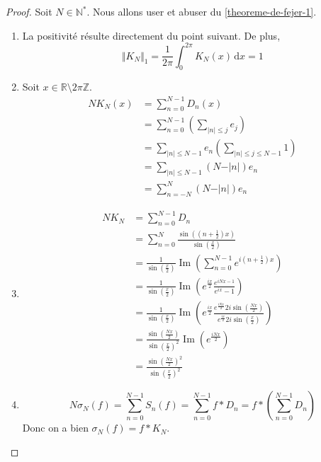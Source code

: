 	\begin{proof}
		Soit $N\in\mathbb{N}^*$. Nous allons user et abuser du \cref{theoreme-de-fejer-1}.
		\begin{enumerate}[label=(\roman*)]
			\item La positivité résulte directement du point suivant. De plus,
			\[ \Vert K_N \Vert_1 = \frac{1}{2\pi} \int_0^{2\pi} K_N(x) \, \mathrm{d}x = 1 \]
			\item Soit $x\in\mathbb{R}\setminus 2\pi\mathbb{Z}$.
			\begin{align*}
				NK_N(x)&=\sum_{n=0}^{N-1} D_n(x) \\
				&= \sum_{n=0}^{N-1} \left( \sum_{\vert n \vert \leq j} e_j \right) \\
				&= \sum_{\vert n \vert \leq N-1} e_n \left( \sum_{\vert n \vert \leq j \leq N-1} 1 \right) \\
				&= \sum_{\vert n \vert \leq N-1} (N - \vert n \vert) e_n \\
				&= \sum_{n=-N}^{N} (N - \vert n \vert) e_n
			\end{align*}
			\item \begin{align*}
				NK_N&=\sum_{n=0}^{N-1}{D_n} \\
				&=\sum_{n=0}^{N}{\frac{\sin \left( \left( n + \frac{1}{2} \right) x \right)}{\sin \left ( \frac{x}{2} \right)}} \\
				&=\frac{1}{\sin \left ( \frac{x}{2} \right)}\operatorname{Im} \left( \sum_{n=0}^{N-1}{e^{i(n+\frac{1}{2})x}} \right) \\
				&=\frac{1}{\sin \left ( \frac{x}{2} \right)}\operatorname{Im} \left ( e^{\frac{ix}{2}}\frac{e^{iNx-1}}{e^{ix}-1} \right) \\
				&=\frac{1}{\sin \left ( \frac{x}{2} \right)} \operatorname{Im} \left ( e^{\frac{ix}{2}}\frac{e^{\frac{iNx}{2}}2i\sin \left( \frac{Nx}{2} \right)}{e^{\frac{ix}{2}}2i \sin \left ( \frac{x}{2} \right)} \right ) \\
				&=\frac{\sin \left( \frac{Nx}{2} \right)}{\sin \left ( \frac{x}{2} \right)^2}\operatorname{Im} \left(e^{\frac{iNx}{2}} \right) \\
				&=\frac{\sin \left( \frac{Nx}{2} \right)^2}{\sin \left ( \frac{x}{2} \right)^2}
			\end{align*}
			\item \[ N \sigma_N(f) = \sum_{n=0}^{N-1} S_n(f) = \sum_{n=0}^{N-1} f * D_n = f * \left (\sum_{n=0}^{N-1} D_n \right) \]
			Donc on a bien $\sigma_N(f) = f * K_N$.
		\end{enumerate}
	\end{proof}

